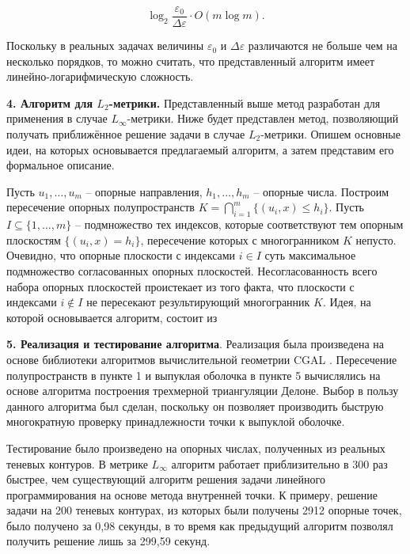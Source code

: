 \documentclass[a4paper, 10pt]{article}
\theoremstyle{definition}
\theoremstyle{plain}
\theoremstyle{plain}
\begin{document}
\begin{equation*}
 \log_{2} \frac{\varepsilon_{0}}{\Delta \varepsilon} \cdot O(m \log m).
\end{equation*}

Поскольку в реальных задачах величины $\varepsilon_{0}$ и
$\Delta \varepsilon$ различаются не больше чем на несколько порядков, то
можно считать, что представленный алгоритм имеет линейно-логарифмическую
сложность.

\textbf{4. Алгоритм для $L_{2}$-метрики.}
Представленный выше метод разработан для применения в случае
$L_{\infty}$-метрики. Ниже будет представлен метод, позволяющий получать
приближённое решение задачи в случае $L_{2}$-метрики. Опишем основные идеи, на
которых основывается предлагаемый алгоритм, а затем представим его формальное
описание.

Пусть $u_{1}, \ldots, u_{m}$ -- опорные
направления, $h_{1}, \ldots, h_{m}$ -- опорные числа. Построим пересечение
опорных полупространств
$K = \bigcap \limits_{i = 1}^{m}\{(u_{i}, x) \leq h_{i}\}$.
Пусть $I \subseteq \{1, \ldots, m\}$ -- подмножество тех индексов,
которые соответствуют тем опорным плоскостям $\{(u_{i}, x) = h_{i}\}$,
пересечение которых с многогранником $K$ непусто. Очевидно, что опорные
плоскости с индексами $i \in I$ суть максимальное подмножество согласованных
опорных плоскостей. Несогласованность всего набора опорных плоскостей
проистекает из того факта, что плоскости с индексами $i \notin I$ не пересекают
результирующий многогранник $K$. Идея, на которой основывается алгоритм,
состоит из 

\textbf{5. Реализация и тестирование алгоритма}.
Реализация была произведена на основе библиотеки алгоритмов вычислительной
геометрии CGAL \cite{cgal}. Пересечение полупространств в пункте 1 и выпуклая
оболочка в пункте 5 вычислялись на основе алгоритма построения трехмерной
триангуляции Делоне. Выбор в пользу данного алгоритма был сделан, поскольку он
позволяет производить быструю многократную проверку принадлежности точки к
выпуклой оболочке.

Тестирование было произведено на опорных числах, полученных из реальных
теневых контуров. В метрике $L_{\infty}$ алгоритм работает приблизительно в 300
раз быстрее, чем существующий алгоритм решения задачи линейного программирования
на основе метода внутренней точки. К примеру, решение задачи на 200 теневых
контурах, из которых были получены 2912 опорные точек, было получено за 0,98
секунды, в то время как предыдущий алгоритм позволял получить решение лишь за
299,59 секунд.
\end{document}
